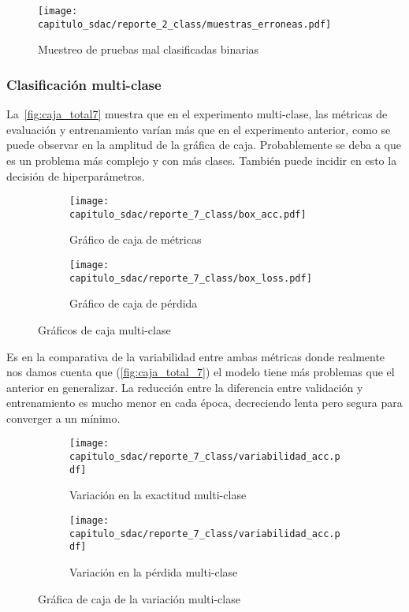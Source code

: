 \begin{figure}[H]
    \centering
    \texttt{[image: capitulo\_sdac/reporte\_2\_class/muestras\_erroneas.pdf]}
    \caption{Muestreo de pruebas mal clasificadas binarias}\label{fig:muestreo_error_2}
\end{figure}


\subsubsection{Clasificación multi-clase}

La~\autoref{fig:caja_total7} muestra que en el experimento multi-clase, las
métricas de evaluación y entrenamiento varían más que en el experimento
anterior, como se puede observar en la amplitud de la gráfica de caja.
Probablemente se deba a que es un problema más complejo y con más clases.
También puede incidir en esto la decisión de hiperparámetros.

\begin{figure}[H]
    \centering
    \begin{subfigure}[b]{0.6\textwidth}
        \centering
        \texttt{[image: capitulo\_sdac/reporte\_7\_class/box\_acc.pdf]}
        \caption{Gráfico de caja de métricas}\label{fig:caja_acc7} 
    \end{subfigure}

    \begin{subfigure}[b]{0.6\textwidth}
        \centering
        \texttt{[image: capitulo\_sdac/reporte\_7\_class/box\_loss.pdf]}
        \caption{Gráfico de caja de pérdida}\label{fig:caja_loss7}
    \end{subfigure}
    \caption{Gráficos de caja multi-clase}\label{fig:caja_total7}
\end{figure}


Es en la comparativa de la variabilidad entre ambas métricas donde realmente nos
damos cuenta que (\autoref{fig:caja_total_7}) el modelo tiene más problemas que
el anterior en generalizar. La reducción entre la diferencia entre validación y
entrenamiento es mucho menor en cada época, decreciendo lenta pero segura para
converger a un mínimo.

\begin{figure}[H]
    \centering
    \begin{subfigure}[b]{0.6\textwidth}
        \centering
        \texttt{[image: capitulo\_sdac/reporte\_7\_class/variabilidad\_acc.pdf]}
        \caption{Variación en la exactitud multi-clase}\label{fig:caja_acc_7} 
    \end{subfigure}

    \begin{subfigure}[b]{0.6\textwidth}
        \centering
        \texttt{[image: capitulo\_sdac/reporte\_7\_class/variabilidad\_acc.pdf]}
        \caption{Variación en la pérdida multi-clase}\label{fig:caja_loss_7}
    \end{subfigure}
    \caption{Gráfica de caja de la variación multi-clase}\label{fig:caja_total_7}
\end{figure}


